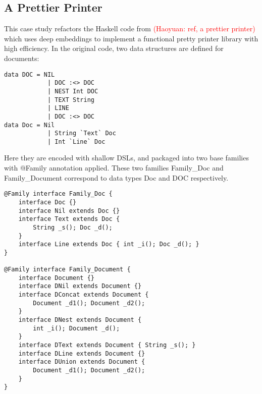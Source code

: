 \subsection{A Prettier Printer}

This case study refactors the Haskell code from \textcolor{red}{(Haoyuan: ref, a prettier printer)}
which uses deep embeddings to implement a functional pretty printer library with high efficiency. In the original code, two
data structures are defined for documents:
\begin{lstlisting}[keywords={data,Int,String}]
data DOC = NIL
            | DOC :<> DOC
            | NEST Int DOC
            | TEXT String
            | LINE
            | DOC :<> DOC
data Doc = Nil
            | String `Text` Doc
            | Int `Line` Doc
\end{lstlisting}
Here they are encoded with shallow DSLs, and packaged into
two base families with \textsf{@Family} annotation applied. These two families \textsf{Family\_Doc} and
\textsf{Family\_Document} correspond to data types \textsf{Doc} and \textsf{DOC} respectively.

\begin{lstlisting}
@Family interface Family_Doc {
	interface Doc {}
	interface Nil extends Doc {}
	interface Text extends Doc {
		String _s(); Doc _d();
	}
	interface Line extends Doc { int _i(); Doc _d(); }
}

@Family interface Family_Document {
	interface Document {}
	interface DNil extends Document {}
	interface DConcat extends Document {
		Document _d1(); Document _d2();
	}
	interface DNest extends Document {
		int _i(); Document _d();
	}
	interface DText extends Document { String _s(); }
	interface DLine extends Document {}
	interface DUnion extends Document {
		Document _d1(); Document _d2();
	}
}
\end{lstlisting}


